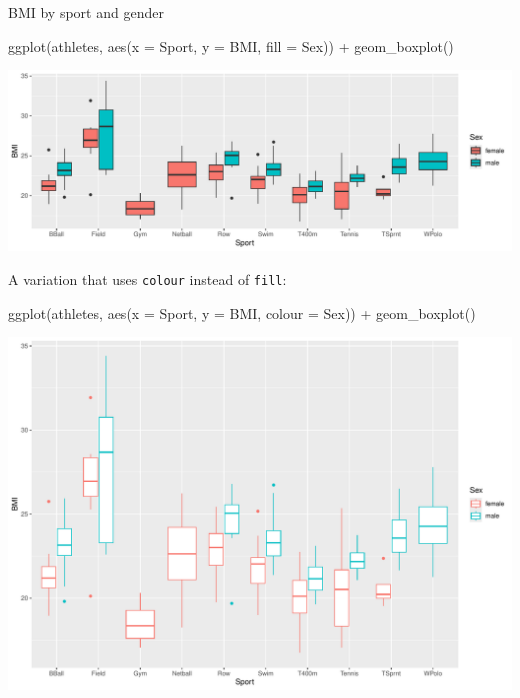 \documentclass[
  ignorenonframetext,
]{beamer}
\newenvironment{Shaded}{\begin{snugshade}}{\end{snugshade}}
\newcommand{\AttributeTok}[1]{\textcolor[rgb]{0.40,0.45,0.13}{#1}}
\newcommand{\FunctionTok}[1]{\textcolor[rgb]{0.28,0.35,0.67}{#1}}
\newcommand{\NormalTok}[1]{\textcolor[rgb]{0.00,0.23,0.31}{#1}}
\newcommand{\SpecialCharTok}[1]{\textcolor[rgb]{0.37,0.37,0.37}{#1}}
\begin{document}
\begin{frame}[fragile]{BMI by sport and gender}
\label{bmi-by-sport-and-gender}
\begin{Shaded}
\begin{Highlighting}[]
\FunctionTok{ggplot}\NormalTok{(athletes, }\FunctionTok{aes}\NormalTok{(}\AttributeTok{x =}\NormalTok{ Sport, }\AttributeTok{y =}\NormalTok{ BMI, }\AttributeTok{fill =}\NormalTok{ Sex)) }\SpecialCharTok{+}
  \FunctionTok{geom\_boxplot}\NormalTok{()}
\end{Highlighting}
\end{Shaded}

\includegraphics{graphs_files/figure-beamer/graphs-R-10-1.pdf}

A variation that uses \texttt{colour} instead of \texttt{fill}:

\begin{Shaded}
\begin{Highlighting}[]
\FunctionTok{ggplot}\NormalTok{(athletes, }\FunctionTok{aes}\NormalTok{(}\AttributeTok{x =}\NormalTok{ Sport, }\AttributeTok{y =}\NormalTok{ BMI, }\AttributeTok{colour =}\NormalTok{ Sex)) }\SpecialCharTok{+}
  \FunctionTok{geom\_boxplot}\NormalTok{()}
\end{Highlighting}
\end{Shaded}

\includegraphics{graphs_files/figure-beamer/unnamed-chunk-1-1.pdf}
\end{frame}
\end{document}
